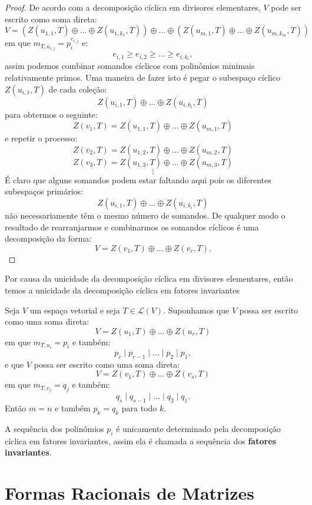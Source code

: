 \documentclass[11pt,twoside,a4paper]{book}
\begin{document}
\begin{proof}
De acordo com a decomposição cíclica em divisores elementares, $V$ pode ser escrito como soma direta:
\[
V=\left(Z(u_{1,1},T)\oplus\dots\oplus Z(u_{1,k_1},T)\right)\oplus\dots\oplus\left(Z(u_{m,1},T)\oplus\dots\oplus Z(u_{m,k_m},T)\right)
\]
em que $m_{T,u_{i,j}}=p_i^{e_{i,j}}$ e:
\[
e_{i,1}\geq e_{i,2}\geq\dots\geq e_{i,k_i},
\]
assim podemos combinar somandos cíclicos com polinômios minimais relativamente primos. Uma maneira de fazer isto é pegar o subespaço cíclico $Z(u_{i,1},T)$ de cada coleção:
\[
Z(u_{i,1},T)\oplus\dots\oplus Z(u_{i,k_i},T)
\]
para obtermos o seguinte:
\[
Z(v_1,T)=Z(u_{1,1},T)\oplus\dots\oplus Z(u_{m,1},T)
\]
e repetir o processo:
\[
Z(v_2,T)=Z(u_{1,2},T)\oplus\dots\oplus Z(u_{m,2},T)
\]
\[
Z(v_3,T)=Z(u_{1,3},T)\oplus\dots\oplus Z(u_{m,3},T)
\]
\[
\vdots
\]
É claro que alguns somandos podem estar faltando aqui pois os diferentes subespaços primários:
\[
Z(u_{i,1},T)\oplus\dots\oplus Z(u_{i,k_i},T)
\]
não necessariamente têm o mesmo número de somandos. De qualquer modo o resultado de rearranjarmos e combinarmos os somandos cíclicos é uma decomposição da forma:
\[
V=Z(v_1,T)\oplus\dots\oplus Z(v_r,T).
\]
\end{proof}

\noindent
Por causa da unicidade da decomposição cíclica em divisores elementares, então temos a unicidade da decomposição cíclica em fatores invariantes

\begin{teorema}
Seja $V$ um espaço vetorial e seja $T\in\mathcal{L}(V)$. Suponhamos que $V$ possa ser escrito como uma soma direta:
\[
V=Z(u_1,T)\oplus\dots\oplus Z(u_r,T)
\]
em que $m_{T,u_i}=p_i$ e também:
\[
p_r\mid p_{r-1}\mid\dots\mid p_2\mid p_1,
\]
e que $V$ possa ser escrito como uma soma direta:
\[
V=Z(v_1,T)\oplus\dots\oplus Z(v_s,T)
\]
em que $m_{T,v_j}=q_j$ e também:
\[
q_s\mid q_{s-1}\mid\dots\mid q_2\mid q_1.
\]
Então $m=n$ e também $p_k=q_k$ para todo $k$.
\end{teorema}

\begin{definicao}
A sequência dos polinômios $p_i$ é unicamente determinado pela decomposição cíclica em fatores invariantes, assim ela é chamada a sequência dos \textbf{fatores invariantes}.
\end{definicao}

\section{Formas Racionais de Matrizes}
\end{document}
